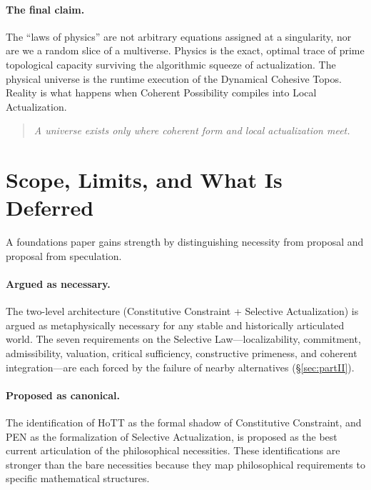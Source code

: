 \documentclass[11pt,a4paper]{article}
\theoremstyle{plain}
\theoremstyle{definition}
\theoremstyle{remark}
\begin{document}
\paragraph{The final claim.}
The ``laws of physics'' are not arbitrary equations assigned at a singularity, nor are we a random slice of a multiverse.  Physics is the exact, optimal trace of prime topological capacity surviving the algorithmic squeeze of actualization.  The physical universe is the runtime execution of the Dynamical Cohesive Topos.  Reality is what happens when Coherent Possibility compiles into Local Actualization.

\begin{quote}
\emph{A universe exists only where coherent form and local actualization meet.}
\end{quote}


\section*{Scope, Limits, and What Is Deferred}

A foundations paper gains strength by distinguishing necessity from proposal and proposal from speculation.

\paragraph{Argued as necessary.}
The two-level architecture (Constitutive Constraint + Selective Actualization) is argued as metaphysically necessary for any stable and historically articulated world.  The seven requirements on the Selective Law---localizability, commitment, admissibility, valuation, critical sufficiency, constructive primeness, and coherent integration---are each forced by the failure of nearby alternatives (\S\ref{sec:partII}).

\paragraph{Proposed as canonical.}
The identification of HoTT as the formal shadow of Constitutive Constraint, and PEN as the formalization of Selective Actualization, is proposed as the best current articulation of the philosophical necessities.  These identifications are stronger than the bare necessities because they map philosophical requirements to specific mathematical structures.
\end{document}
